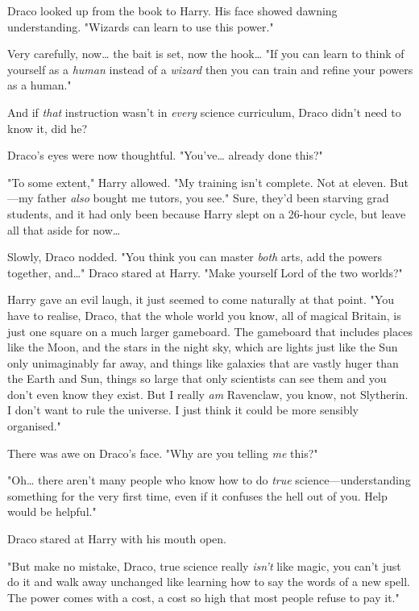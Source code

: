 Draco looked up from the book to Harry. His face showed dawning understanding. 
"Wizards can learn to use this power."

Very carefully, now{\ldots} the bait is set, now the hook{\ldots} "If you can 
learn to think of yourself as a \emph{human} instead of a \emph{wizard} then 
you can train and refine your powers as a human."

And if \emph{that} instruction wasn't in \emph{every} science curriculum, Draco 
didn't need to know it, did he?

Draco's eyes were now thoughtful. "You've{\ldots} already done this?"

"To some extent," Harry allowed. "My training isn't complete. Not at eleven. 
But---my father \emph{also} bought me tutors, you see." Sure, they'd been 
starving grad students, and it had only been because Harry slept on a 26-hour 
cycle, but leave all that aside for now{\ldots}

Slowly, Draco nodded. "You think you can master \emph{both} arts, add the 
powers together, and{\ldots}" Draco stared at Harry. "Make yourself Lord of the 
two worlds?"

Harry gave an evil laugh, it just seemed to come naturally at that point. "You 
have to realise, Draco, that the whole world you know, all of magical Britain, 
is just one square on a much larger gameboard. The gameboard that includes 
places like the Moon, and the stars in the night sky, which are lights just 
like the Sun only unimaginably far away, and things like galaxies that are 
vastly huger than the Earth and Sun, things so large that only scientists can 
see them and you don't even know they exist. But I really \emph{am} Ravenclaw, 
you know, not Slytherin. I don't want to rule the universe. I just think it 
could be more sensibly organised."

There was awe on Draco's face. "Why are you telling \emph{me} this?"

"Oh{\ldots} there aren't many people who know how to do \emph{true} 
science---understanding something for the very first time, even if it confuses 
the hell out of you. Help would be helpful."

Draco stared at Harry with his mouth open.

"But make no mistake, Draco, true science really \emph{isn't} like magic, you 
can't just do it and walk away unchanged like learning how to say the words of 
a new spell. The power comes with a cost, a cost so high that most people 
refuse to pay it."

